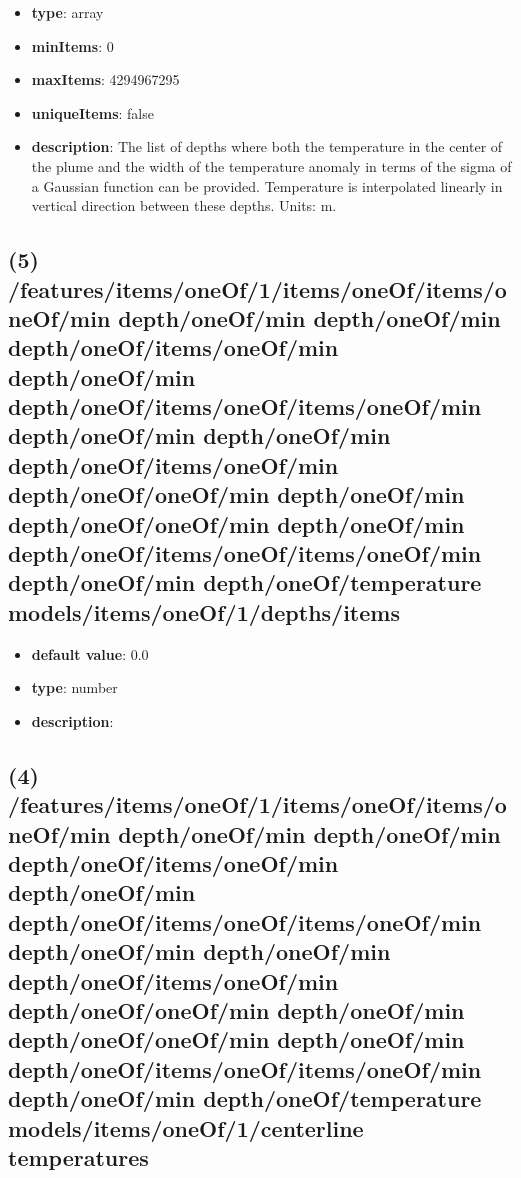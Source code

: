 \begin{itemize}[leftmargin=4em]\item {\bf type}: array
\item {\bf minItems}: 0
\item {\bf maxItems}: 4294967295
\item {\bf uniqueItems}: false
\item {\bf description}: The list of depths where both the temperature in the center of the plume and the width of the temperature anomaly in terms of the sigma of a Gaussian function can be provided. Temperature is interpolated linearly in vertical direction between these depths. Units: m.
\end{itemize}\subsection{(5) /features/items/oneOf/1/items/oneOf/items/oneOf/min depth/oneOf/min depth/oneOf/min depth/oneOf/items/oneOf/min depth/oneOf/min depth/oneOf/items/oneOf/items/oneOf/min depth/oneOf/min depth/oneOf/min depth/oneOf/items/oneOf/min depth/oneOf/oneOf/min depth/oneOf/min depth/oneOf/oneOf/min depth/oneOf/min depth/oneOf/items/oneOf/items/oneOf/min depth/oneOf/min depth/oneOf/temperature models/items/oneOf/1/depths/items}
\begin{itemize}[leftmargin=5em]\item {\bf default value}: 0.0
\item {\bf type}: number
\item {\bf description}: 
\end{itemize}\subsection{(4) /features/items/oneOf/1/items/oneOf/items/oneOf/min depth/oneOf/min depth/oneOf/min depth/oneOf/items/oneOf/min depth/oneOf/min depth/oneOf/items/oneOf/items/oneOf/min depth/oneOf/min depth/oneOf/min depth/oneOf/items/oneOf/min depth/oneOf/oneOf/min depth/oneOf/min depth/oneOf/oneOf/min depth/oneOf/min depth/oneOf/items/oneOf/items/oneOf/min depth/oneOf/min depth/oneOf/temperature models/items/oneOf/1/centerline temperatures}
